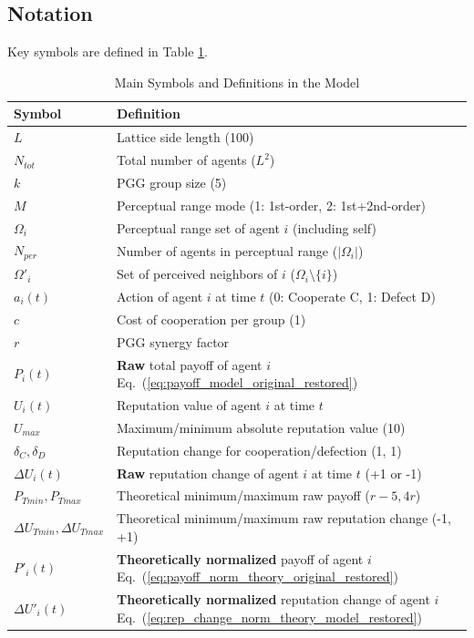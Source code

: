 \documentclass[preprint,number,sort&compress,12pt]{elsarticle}
\renewcommand{\eqref}[1]{Eq.~(\ref{#1})}
\begin{document}
\subsection{Notation}
Key symbols are defined in Table \ref{tab:symbols_model_restored}.
\begin{table}[htbp]
\centering
\caption{Main Symbols and Definitions in the Model}
\label{tab:symbols_model_restored}
\begin{tabular}{@{}ll@{}}
\toprule
Symbol & Definition \\
\midrule
$L$ & Lattice side length (100) \\
$N_{tot}$ & Total number of agents ($L^2$) \\
$k$ & PGG group size (5) \\
$M$ & Perceptual range mode (1: 1st-order, 2: 1st+2nd-order) \\
$\Omega_i$ & Perceptual range set of agent $i$ (including self) \\
$N_{per}$ & Number of agents in perceptual range ($|\Omega_i|$) \\
$\Omega'_i$ & Set of perceived neighbors of $i$ ($\Omega_i \setminus \{i\}$) \\
$a_i(t)$ & Action of agent $i$ at time $t$ (0: Cooperate C, 1: Defect D) \\
$c$ & Cost of cooperation per group (1) \\
$r$ & PGG synergy factor \\
$P_i(t)$ & \textbf{Raw} total payoff of agent $i$ \eqref{eq:payoff_model_original_restored} \\
$U_i(t)$ & Reputation value of agent $i$ at time $t$ \\
$U_{max}$ & Maximum/minimum absolute reputation value (10) \\
$\delta_C, \delta_D$ & Reputation change for cooperation/defection (1, 1) \\
$\Delta U_i(t)$ & \textbf{Raw} reputation change of agent $i$ at time $t$ (+1 or -1) \\
$P_{Tmin}, P_{Tmax}$ & Theoretical minimum/maximum raw payoff ($r-5, 4r$) \\
$\Delta U_{Tmin}, \Delta U_{Tmax}$ & Theoretical minimum/maximum raw reputation change (-1, +1) \\
$P'_i(t)$ & \textbf{Theoretically normalized} payoff of agent $i$ \eqref{eq:payoff_norm_theory_original_restored} \\
$\Delta U'_i(t)$ & \textbf{Theoretically normalized} reputation change of agent $i$ \eqref{eq:rep_change_norm_theory_model_restored} \\

\end{tabular}
\end{table}
\end{document}
